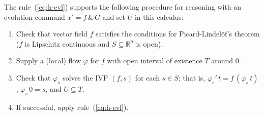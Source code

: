 \documentclass[envcountsame]{llncs}
\newcommand{\flow}{\varphi}
\newcommand{\reals}{\mathbb{R}}
\begin{document}
The rule~(\ref{eq:h-evl}) supports the following procedure
for reasoning with an evolution command $x' = f\, \&\, G$ and set $U$
in this calculus:
\begin{enumerate}
\item Check that vector field $f$ satisfies the conditions for
  Picard-Lindel\"of's theorem ($f$ is Lipschitz continuous and
  $S\subseteq\reals^n$ is open).
\item Supply a (local) flow $\flow$ for $f$ with open interval of
  existence $T$ around $0$.
\item Check that $\flow_s$ solves the IVP $(f,s)$ for each $s\in S$;
  that is, $\flow_s'\, t = f\, (\flow_s\, t)$, $\flow_s\, 0 = s$, and
  $U\subseteq T$.
\item If successful, apply rule~(\ref{eq:h-evl}).
\end{enumerate}
\end{document}
